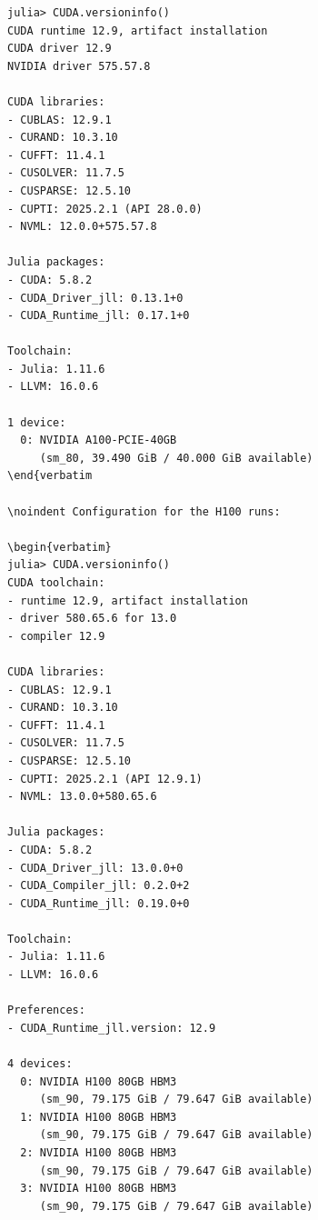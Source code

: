 \begin{verbatim}
julia> CUDA.versioninfo()
CUDA runtime 12.9, artifact installation
CUDA driver 12.9
NVIDIA driver 575.57.8

CUDA libraries: 
- CUBLAS: 12.9.1
- CURAND: 10.3.10
- CUFFT: 11.4.1
- CUSOLVER: 11.7.5
- CUSPARSE: 12.5.10
- CUPTI: 2025.2.1 (API 28.0.0)
- NVML: 12.0.0+575.57.8

Julia packages: 
- CUDA: 5.8.2
- CUDA_Driver_jll: 0.13.1+0
- CUDA_Runtime_jll: 0.17.1+0

Toolchain:
- Julia: 1.11.6
- LLVM: 16.0.6

1 device:
  0: NVIDIA A100-PCIE-40GB
     (sm_80, 39.490 GiB / 40.000 GiB available)
\end{verbatim

\noindent Configuration for the H100 runs:

\begin{verbatim}
julia> CUDA.versioninfo()
CUDA toolchain: 
- runtime 12.9, artifact installation
- driver 580.65.6 for 13.0
- compiler 12.9

CUDA libraries: 
- CUBLAS: 12.9.1
- CURAND: 10.3.10
- CUFFT: 11.4.1
- CUSOLVER: 11.7.5
- CUSPARSE: 12.5.10
- CUPTI: 2025.2.1 (API 12.9.1)
- NVML: 13.0.0+580.65.6

Julia packages: 
- CUDA: 5.8.2
- CUDA_Driver_jll: 13.0.0+0
- CUDA_Compiler_jll: 0.2.0+2
- CUDA_Runtime_jll: 0.19.0+0

Toolchain:
- Julia: 1.11.6
- LLVM: 16.0.6

Preferences:
- CUDA_Runtime_jll.version: 12.9

4 devices:
  0: NVIDIA H100 80GB HBM3
     (sm_90, 79.175 GiB / 79.647 GiB available)
  1: NVIDIA H100 80GB HBM3
     (sm_90, 79.175 GiB / 79.647 GiB available)
  2: NVIDIA H100 80GB HBM3
     (sm_90, 79.175 GiB / 79.647 GiB available)
  3: NVIDIA H100 80GB HBM3
     (sm_90, 79.175 GiB / 79.647 GiB available)
\end{verbatim}

